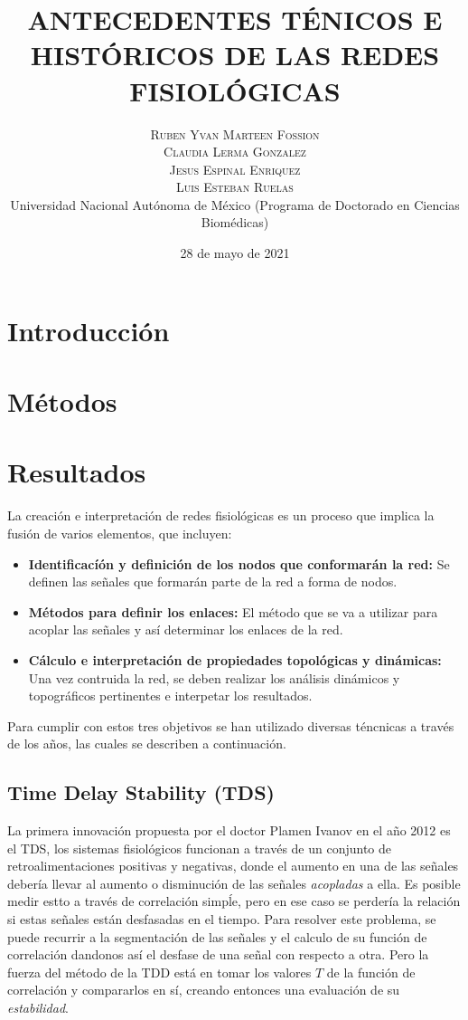 \documentclass[twoside,twocolumn]{article}
\title{ANTECEDENTES TÉNICOS E HISTÓRICOS DE LAS REDES FISIOLÓGICAS} %
\author{%
\textsc{Ruben Yvan Marteen Fossion} \\[1ex]
\textsc{Claudia Lerma Gonzalez} \\[1ex]
\textsc{Jesus Espinal Enriquez} \\[1ex] %
\textsc{Luis Esteban Ruelas} \\[1ex] %
\normalsize Universidad Nacional Autónoma de México
 (Programa de Doctorado en Ciencias Biomédicas)\\ %
}
\date{28 de mayo de 2021} %
\begin{document}
\renewcommand{\abstractname}{Resumen}
\maketitle


\section{Introducción}


\section{Métodos}


\section{Resultados}
La creación e interpretación de redes fisiológicas es un proceso que implica la fusión de varios elementos, que incluyen:
\begin{itemize}
  \item \textbf{Identificacíón y definición de los nodos que conformarán la red:} Se definen las señales que formarán parte de la red a forma de nodos.
  \item \textbf{Métodos para definir los enlaces:} El método que se va a utilizar para acoplar las señales y así determinar los enlaces de la red.
  \item \textbf{Cálculo e interpretación de propiedades topológicas y dinámicas:} Una vez contruida la red, se deben realizar los análisis dinámicos y topográficos pertinentes e interpetar los resultados.
\end{itemize}
Para cumplir con estos tres objetivos se han utilizado diversas téncnicas a través de los años, las cuales se describen a continuación.
\subsection{Time Delay Stability (TDS)}
La primera innovación propuesta por el doctor Plamen Ivanov en el año 2012 es el TDS\cite{bashan2012network}, los sistemas fisiológicos funcionan a través de un conjunto de retroalimentaciones positivas y negativas, donde el aumento en una de las señales debería llevar al aumento o disminución de las señales \textit{acopladas} a ella. Es posible medir estto a través de correlación simpĺe, pero en ese caso se perdería la relación si estas señales están desfasadas en el tiempo.
Para resolver este problema, se puede recurrir a la segmentación de las señales y el calculo de su función de correlación dandonos así el desfase de una señal con respecto a otra. Pero la fuerza del método de la TDD está en tomar los valores $T$ de la función de correlación y compararlos en sí, creando entonces una evaluación de su \textit{estabilidad}.
\end{document}
